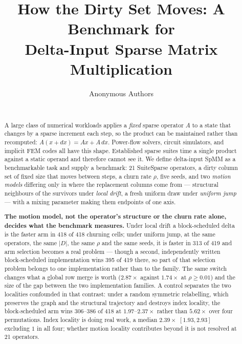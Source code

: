\documentclass{article}
\title{How the Dirty Set Moves: A Benchmark for\\Delta-Input Sparse Matrix
Multiplication}
\author{%
  Anonymous Authors\\
  \texttt{}\\
}
\begin{document}
\maketitle

\begin{abstract}
A large class of numerical workloads applies a \emph{fixed} sparse operator $A$
to a state that changes by a sparse increment each step, so the product can be
maintained rather than recomputed: $A(x{+}dx) = Ax + A\,dx$. Power-flow solvers,
circuit simulators, and implicit FEM codes all have this shape. Established
sparse suites time a single product against a static operand and therefore
cannot see it. We define delta-input SpMM as a benchmarkable task and supply a
benchmark: 21 SuiteSparse operators, a dirty column set of fixed size that moves
between steps, a churn rate $\rho$, five seeds, and two \emph{motion models}
differing only in where the replacement columns come from --- structural
neighbours of the survivors under \emph{local drift}, a fresh uniform draw under
\emph{uniform jump} --- with a mixing parameter making them endpoints of one axis.

\textbf{The motion model, not the operator's structure or the churn rate alone,
decides what the benchmark measures.} Under local drift a block-scheduled delta
is the faster arm in 418 of 418 churning cells; under uniform jump, at the same
operators, the same $|D|$, the same $\rho$ and the same seeds, it is faster in
313 of 419 and arm selection becomes a real problem --- though a second,
independently written block-scheduled implementation wins 395 of 419 there, so
part of that selection problem belongs to one implementation rather than to the
family. The same switch changes what
a global row merge is worth ($2.87\times$ against $1.74\times$ at $\rho \geq
0.01$) and the size of the gap between the two implementation families. A
control separates the two localities confounded in that contrast: under a random
symmetric relabelling, which preserves the graph and the structural trajectory
and destroys index locality, the block-scheduled arm wins 306--386 of 418 at
$1.97$--$2.37\times$ rather than $5.62\times$ over four permutations. Index
locality is doing real work, a median $2.39\times$ $[1.93, 2.93]$ excluding $1$
in all four; whether motion locality contributes beyond it is not resolved at 21
operators.


\end{abstract}
\end{document}
